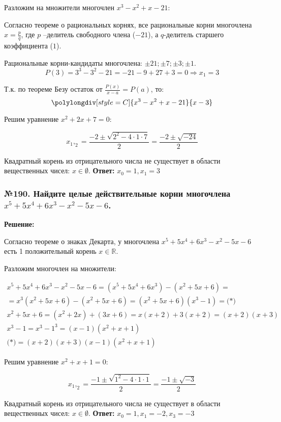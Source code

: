 \documentclass[a4paper]{article}
\begin{document}
Разложим на множители многочлен $x^3-x^2+x-21$: \par
Согласно теореме о рациональных корнях, все рациональные корни многочлена $x=\frac{p}{q}$, где $p$ --делитель свободного члена ($-21$), а $q$-делитель старшего коэффициента ($1$). \par
Рациональные корни-кандидаты многочлена: $\pm21; \pm7; \pm3; \pm1$.
\[P(3)=3^3-3^2-21=-21-9+27+3=0 \Rightarrow x_1=3\] \par
Т.к. по теореме Безу остаток от $\frac{P(x)}{x-a}=P(a)$, то:
\[\polylongdiv[style=C]{x^3-x^2+x-21}{x-3}\] \par
Решим уравнение $x^2+2x+7=0$: \par
\[x_1,_2=\frac{-2\pm\sqrt{2^2-4\cdot1\cdot7}}{2}=\frac{-2\pm\sqrt{-24}}{2}\] \par
Квадратный корень из отрицательного числа не существует в области вещественных чисел: $x \in  \emptyset$. \newline
\textbf{Ответ:} $x_0=1, x_1=3$

\subsubsection*{№190. Найдите целые действительные корни многочлена $x^5+5x^4+6x^3-x^2-5x-6$.}
\textbf{Решение:} \par

Согласно теореме о знаках Декарта, у многочлена $x^5+5x^4+6x^3-x^2-5x-6$ есть 1 положительный корень $x \in \mathbb{R}$. \par
Разложим многочлен на множители:

\begin{gather*}
	x^5+5x^4+6x^3-x^2-5x-6=(x^5+5x^4+6x^3)-(x^2+5x+6)= \\
	=x^3(x^2+5x+6)-(x^2+5x+6)=(x^2+5x+6)(x^3-1)=\textbf{(*)} \\
	x^2+5x+6=(x^2+2x)+(3x+6)=x(x+2)+3(x+2)=(x+2)(x+3) \\
	x^3-1=x^3-1^3=(x-1)(x^2+x+1) \\
	\textbf{(*)}=(x+2)(x+3)(x-1)(x^2+x+1)
\end{gather*}

Решим уравнение $x^2+x+1=0$: \par
\[x_1,_2=\frac{-1\pm\sqrt{1^2-4\cdot1\cdot1}}{2}=\frac{-1\pm\sqrt{-3}}{2}\] \par
Квадратный корень из отрицательного числа не существует в области вещественных чисел: $x \in  \emptyset$. \newline
\textbf{Ответ:} $x_0=1, x_1=-2, x_3=-3$
\end{document}
